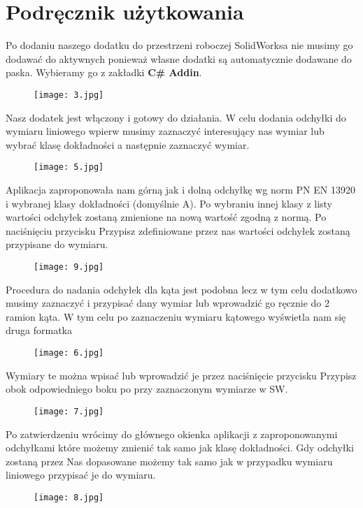 \documentclass[11pt,a4paper]{article}
\begin{document}
\section{Podręcznik użytkowania}
Po dodaniu naszego dodatku do przestrzeni roboczej SolidWorksa nie musimy go dodawać do aktywnych ponieważ własne dodatki są automatycznie dodawane do paska. Wybieramy go z zakładki \textbf{C\# Addin}.
\begin{figure}[h!]
\centering
\texttt{[image: 3.jpg]}
\end{figure}
\newline
Nasz dodatek jest włączony i gotowy do działania.
\newline
W celu dodania odchyłki do wymiaru liniowego wpierw musimy zaznaczyć interesujący nas wymiar lub wybrać klasę dokładności a następnie zaznaczyć wymiar.
\begin{figure}[h!]
\centering
\texttt{[image: 5.jpg]}
\end{figure}
\newline
Aplikacja zaproponowała nam górną jak i dolną odchyłkę wg norm PN EN 13920 i wybranej klasy dokładności (domyślnie A). Po wybraniu innej klasy z listy wartości odchyłek zostaną zmienione na nową wartość zgodną z normą. Po naciśnięciu przycisku Przypisz zdefiniowane przez nas wartości odchyłek zostaną przypisane do wymiaru.
\begin{figure}[h!]
\centering
\texttt{[image: 9.jpg]}
\end{figure}
\newpage
Procedura do nadania odchyłek dla kąta jest podobna lecz w tym celu dodatkowo musimy zaznaczyć i przypisać dany wymiar lub wprowadzić go ręcznie do 2 ramion kąta. W tym celu po zaznaczeniu wymiaru kątowego wyświetla nam się druga formatka
\begin{figure}[h!]
\centering
\texttt{[image: 6.jpg]}
\end{figure}
\newline
Wymiary te można wpisać lub wprowadzić je przez naciśnięcie przycisku Przypisz obok odpowiedniego boku po przy zaznaczonym wymiarze w SW.
\begin{figure}[h!]
\centering
\texttt{[image: 7.jpg]}
\end{figure}
\newline
Po zatwierdzeniu wrócimy do głównego okienka aplikacji z zaproponowanymi odchyłkami które możemy zmienić tak samo jak klasę dokładności. Gdy odchyłki zostaną przez Nas dopasowane możemy tak samo jak w przypadku wymiaru liniowego przypisać je do wymiaru.
\begin{figure}[h!]
\centering
\texttt{[image: 8.jpg]}
\end{figure}
\newline
\end{document}
